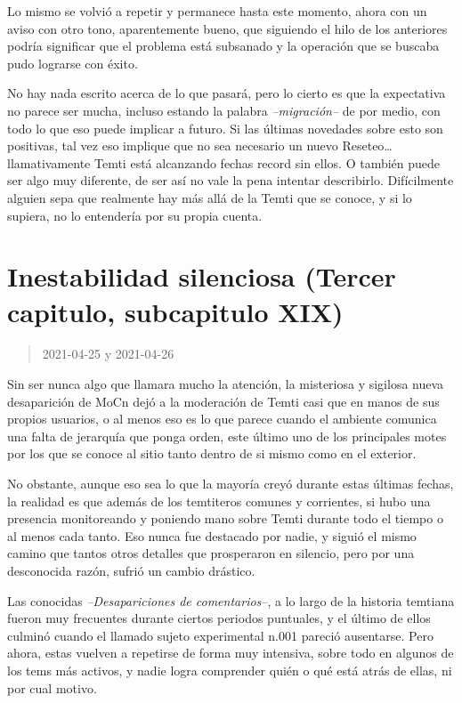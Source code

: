 \documentclass[
  spanish,
]{book}
\begin{document}
Lo mismo se volvió a repetir y permanece hasta este momento, ahora con un aviso con otro tono, aparentemente bueno, que siguiendo el hilo de los anteriores podría significar que el problema está subsanado y la operación que se buscaba pudo lograrse con éxito.

No hay nada escrito acerca de lo que pasará, pero lo cierto es que la expectativa no parece ser mucha, incluso estando la palabra \emph{--migración--} de por medio, con todo lo que eso puede implicar a futuro. Si las últimas novedades sobre esto son positivas, tal vez eso implique que no sea necesario un nuevo Reseteo\ldots{} llamativamente Temti está alcanzando fechas record sin ellos.
O también puede ser algo muy diferente, de ser así no vale la pena intentar describirlo. Difícilmente alguien sepa que realmente hay más allá de la Temti que se conoce, y si lo supiera, no lo entendería por su propia cuenta.

\hypertarget{inestabilidad-silenciosa-tercer-capitulo-subcapitulo-xix}{%
\section{Inestabilidad silenciosa (Tercer capitulo, subcapitulo XIX)}\label{inestabilidad-silenciosa-tercer-capitulo-subcapitulo-xix}}

\begin{quote}
2021-04-25 y 2021-04-26
\end{quote}

Sin ser nunca algo que llamara mucho la atención, la misteriosa y sigilosa nueva desaparición de MoCn dejó a la moderación de Temti casi que en manos de sus propios usuarios, o al menos eso es lo que parece cuando el ambiente comunica una falta de jerarquía que ponga orden, este último uno de los principales motes por los que se conoce al sitio tanto dentro de si mismo como en el exterior.

No obstante, aunque eso sea lo que la mayoría creyó durante estas últimas fechas, la realidad es que además de los temtiteros comunes y corrientes, si hubo una presencia monitoreando y poniendo mano sobre Temti durante todo el tiempo o al menos cada tanto. Eso nunca fue destacado por nadie, y siguió el mismo camino que tantos otros detalles que prosperaron en silencio, pero por una desconocida razón, sufrió un cambio drástico.

Las conocidas \emph{--Desapariciones de comentarios--}, a lo largo de la historia temtiana fueron muy frecuentes durante ciertos periodos puntuales, y el último de ellos culminó cuando el llamado sujeto experimental n.001 pareció ausentarse. Pero ahora, estas vuelven a repetirse de forma muy intensiva, sobre todo en algunos de los tems más activos, y nadie logra comprender quién o qué está atrás de ellas, ni por cual motivo.
\end{document}
